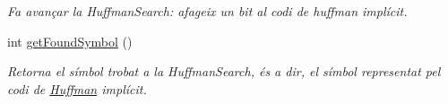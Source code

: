 \begin{DoxyCompactItemize}
\begin{DoxyCompactList}\small\item\em Fa avançar la Huffman\+Search\+: afageix un bit al codi de huffman implícit. \end{DoxyCompactList}\item 
\mbox{\label{classdomini_1_1algorithm_1_1Huffman_a2fa5805057243c65769bf12435e5f363}} 
int \hyperlink{classdomini_1_1algorithm_1_1Huffman_a2fa5805057243c65769bf12435e5f363}{get\+Found\+Symbol} ()
\begin{DoxyCompactList}\small\item\em Retorna el símbol trobat a la Huffman\+Search, és a dir, el símbol representat pel codi de \hyperlink{classdomini_1_1algorithm_1_1Huffman}{Huffman} implícit. \end{DoxyCompactList}\end{DoxyCompactItemize}
